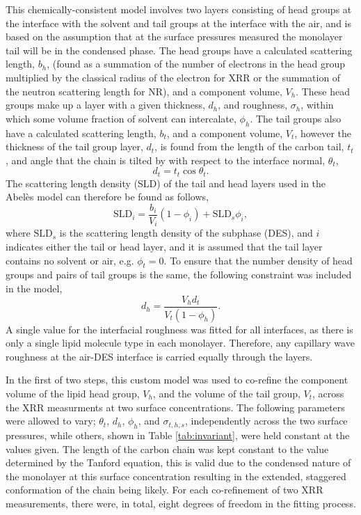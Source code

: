 \documentclass[twoside,twocolumn,9pt]{article}
\begin{document}
This chemically-consistent model involves two layers consisting of head groups at the interface with the solvent and tail groups at the interface with the air, and is based on the assumption that at the surface pressures measured the monolayer tail will be in the condensed phase. The head groups have a calculated scattering length, $b_h$, (found as a summation of the number of electrons in the head group multiplied by the classical radius of the electron for XRR or the summation of the neutron scattering length for NR), and a component volume, $V_h$. These head groups make up a layer with a given thickness, $d_h$, and roughness, $\sigma_h$, within which some volume fraction of solvent can intercalate, $\phi_h$. The tail groups also have a calculated scattering length, $b_t$, and a component volume, $V_t$, however the thickness of the tail group layer, $d_t$, is found from the length of the carbon tail, $t_t$, and angle that the chain is tilted by with respect to the interface normal, $\theta_t$, 
\begin{equation}
\label{equ:tl}
d_t = t_t \cos{\theta_t}.
\end{equation}
The scattering length density (SLD) of the tail and head layers used in the Abel\`{e}s model can therefore be found as follows, 
\begin{equation}
\text{SLD}_i = \frac{b_i}{V_i}(1 - \phi_i) + \text{SLD}_{s}\phi_i,
\end{equation}
where $\text{SLD}_{s}$ is the scattering length density of the subphase (DES), and $i$ indicates either the tail or head layer, and it is assumed that the tail layer contains no solvent or air, e.g. $\phi_t = 0$. To ensure that the number density of head groups and pairs of tail groups is the same, the following constraint was included in the model,\cite{Braun2017}
\begin{equation}
\label{equ:ht}
d_h = \frac{V_hd_t}{V_t(1-\phi_h)}. 
\end{equation}
A single value for the interfacial roughness was fitted for all interfaces, as there is only a single lipid molecule type in each monolayer. Therefore, any capillary wave roughness at the air-DES interface is carried equally through the layers.

In the first of two steps, this custom model was used to co-refine the component volume of the lipid head group, $V_h$, and the volume of the tail group, $V_t$, across the XRR measurments at two surface concentrations. The following parameters were allowed to vary; $\theta_t$, $d_h$, $\phi_h$, and $\sigma_{t,h,s}$, independently across the two surface pressures, while others, shown in Table \ref{tab:invariant}, were held constant at the values given. The length of the carbon chain was kept constant to the value determined by the Tanford equation,\cite{Tanford1980} this is valid due to the condensed nature of the monolayer at this surface concentration resulting in the extended, staggered conformation of the chain being likely. For each co-refinement of two XRR measurements, there were, in total, eight degrees of freedom in the fitting process. 
\end{document}
